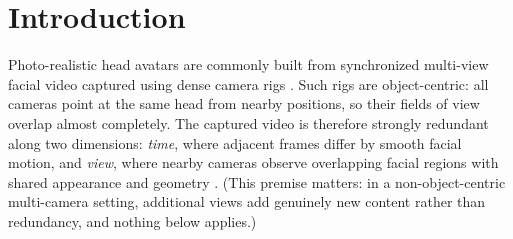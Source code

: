 %

%
%
%

\section{Introduction}

Photo-realistic head avatars are commonly built from synchronized multi-view facial video captured using dense camera rigs \cite{lombardi2018deep, lombardi2021mixture, cao2022authentic,
kirschstein2023nersemble, qian2024gaussianavatars}. Such rigs are object-centric: all cameras point at the same head from nearby positions, so their fields of view overlap almost completely. The captured video is therefore strongly redundant along two dimensions: \emph{time}, where adjacent frames differ by smooth facial motion, and \emph{view}, where nearby cameras observe overlapping facial regions with shared appearance and geometry \cite{taubner2025mvp4d, shah2024mv2mae}. (This premise matters: in a non-object-centric multi-camera setting, additional views add genuinely new content rather than redundancy, and nothing below applies.)



